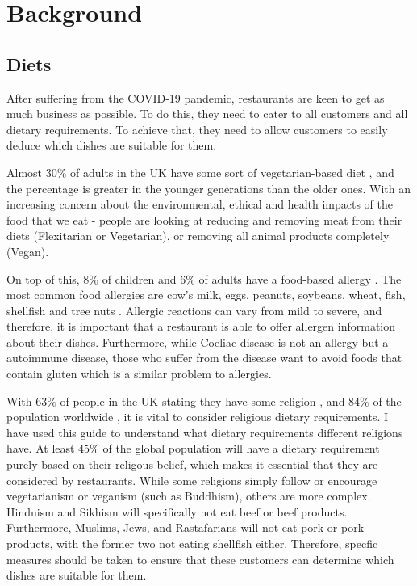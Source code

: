 \chapter{Background}

\section{Diets}

After suffering from the COVID-19 pandemic, restaurants are keen to get as much business as possible. To do this, they need to cater to all customers and all dietary requirements. To achieve that, they need to allow customers to easily deduce which dishes are suitable for them.

Almost 30\% of adults in the UK have some sort of vegetarian-based diet \cite{vege_2022}, and the percentage is greater in the younger generations than the older ones. With an increasing concern about the environmental, ethical and health impacts of the food that we eat - people are looking at reducing and removing meat from their diets (Flexitarian or Vegetarian), or removing all animal products completely (Vegan).

On top of this, 8\% of children and 6\% of adults have a food-based allergy \cite{sicherer_sampson_2017}. The most common food allergies are cow's milk, eggs, peanuts, soybeans, wheat, fish, shellfish and tree nuts \cite{allergies_west_2023}. Allergic reactions can vary from mild to severe, and therefore, it is important that a restaurant is able to offer allergen information about their dishes. Furthermore, while Coeliac disease is not an allergy but a autoimmune disease, those who suffer from the disease want to avoid foods that contain gluten which is a similar problem to allergies.

With 63\% of people in the UK stating they have some religion \cite{religion_ons_census_2021}, and 84\% of the population worldwide \cite{hackett_grim_2012}, it is vital to consider religious dietary requirements. I have used this guide \cite{guidance_on_foods_for_religious_faiths_2009} to understand what dietary requirements different religions have. At least 45\% of the global population will have a dietary requirement purely based on their religous belief, which makes it essential that they are considered by restaurants. While some religions simply follow or encourage vegetarianism or veganism (such as Buddhism), others are more complex. Hinduism and Sikhism will specifically not eat beef or beef products. Furthermore, Muslims, Jews, and Rastafarians will not eat pork or pork products, with the former two not eating shellfish either. Therefore, specfic measures should be taken to ensure that these customers can determine which dishes are suitable for them.

